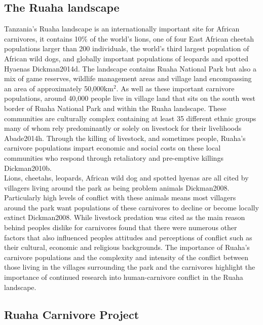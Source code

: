 \subsection{The Ruaha landscape}
 
Tanzania's Ruaha landscape is an internationally important site for African carnivores, it contains 10\% of the world's lions, one of four East African cheetah populations larger than 200 individuals, the world's third largest population of African wild dogs, and globally important populations of leopards and spotted Hyaenas {Dickman2014d}. The landscape contains Ruaha National Park but also a mix of game reserves, wildlife management areas and village land encompassing an area of approximately 50,000km$^2$. As well as these important carnivore populations, around 40,000 people live in village land that sits on the south west border of Ruaha National Park and within the Ruaha landscape. These communities are culturally complex containing at least 35 different ethnic groups many of whom rely predominantly or solely on livestock for their livelihoods  {Abade2014h}. Through the killing of livestock, and sometimes people, Ruaha's carnivore populations impart economic and social costs on these local communities who respond through retaliatory and pre-emptive killings {Dickman2010b}.\\

Lions, cheetahs, leopards, African wild dog and spotted hyenas are all cited by villagers living around the park as being problem animals {Dickman2008}. Particularly high levels of conflict with these animals means most villagers around the park want populations of these carnivores to decline or become locally extinct {Dickman2008}. While livestock predation was cited as the main reason behind peoples dislike for carnivores \citet{Dickman2008} found that there were numerous other factors that also influenced peoples attitudes and perceptions of conflict such as their cultural, economic and religious backgrounds. The importance of Ruaha's carnivore populations and the complexity and intensity of the conflict between those living in the villages surrounding the park and the carnivores highlight the importance of continued research into human-carnivore conflict in the Ruaha landscape.\\

\subsection{Ruaha Carnivore Project}

